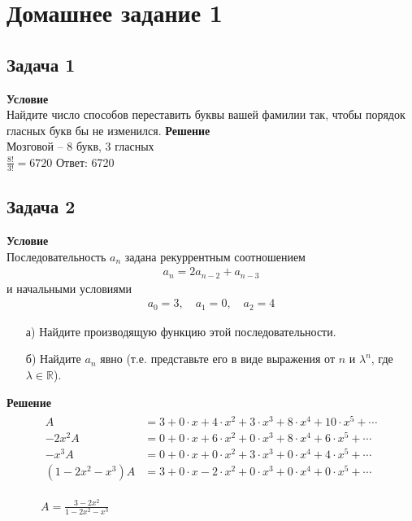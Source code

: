 \newpage		
\section*{Домашнее задание 1}
	\subsection*{Задача 1}
	\noindent
	\textbf{Условие}\\
	Найдите число способов переставить буквы вашей фамилии так, чтобы порядок гласных букв бы не изменился.
	\vskip 0.1in
	\noindent
	\textbf{Решение}\\
	Мозговой -- 8 букв, 3 гласных\\
	$\frac{8!}{3!} = 6720$
	\vskip 0.1in
	\noindent
	Ответ: 6720
	
	
	\subsection*{Задача 2}
	\noindent
	\textbf{Условие}\\
	Последовательность $a_{n}$ задана рекуррентным соотношением
	\begin{gather*}
		a_{n}=2 a_{n-2}+a_{n-3}
	\end{gather*}
	и начальными условиями
	\begin{gather*}
		a_{0}=3, \quad a_{1}=0, \quad a_{2}=4
	\end{gather*}
	\begin{enumerate}
	\item[а)] Найдите производящую функцию этой последовательности.
	\item[б)] Найдите $a_{n}$ явно (т.е. представьте его в виде выражения от $n$ и $\lambda^{n}$, где $\lambda \in \mathbb{R}$).
	\end{enumerate}
	\textbf{Решение}
	\begin{gather*}
		\begin{aligned}
			A & = 3 + 0 \cdot x + 4 \cdot x^{2} + 3 \cdot x^{3} + 8 \cdot x^{4} + 10 \cdot x^{5} + \cdots \\
			-2x^2 A & = 0 + 0 \cdot x + 6 \cdot x^{2} + 0 \cdot x^{3} + 8 \cdot x^{4} + 6 \cdot x^{5} + \cdots\\
			-x^3 A & = 0 + 0 \cdot x + 0 \cdot x^{2} + 3 \cdot x^{3} + 0 \cdot x^{4} + 4 \cdot x^{5} + \cdots\\
			\hline
			(1 - 2x^2 -x^3) A & = 3 + 0 \cdot x - 2 \cdot x^{2} + 0 \cdot x^{3} + 0 \cdot x^{4} + 0 \cdot x^{5} + \cdots\\
		\end{aligned}\\
		\\
		A = 
		\frac{3 - 2x^2}{1 - 2x^2 - x^3}
	\end{gather*}
